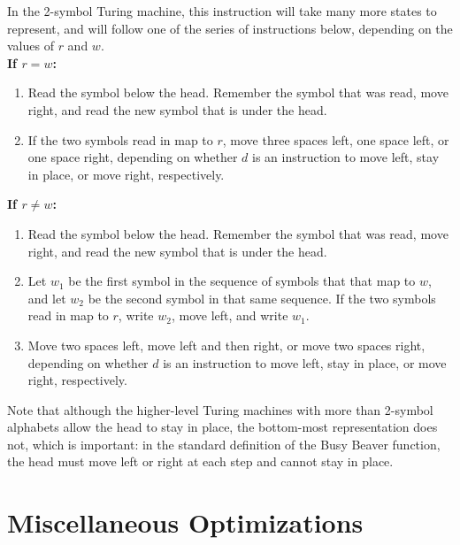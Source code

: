 \documentclass{report}
\begin{document}
In the 2-symbol Turing machine, this instruction will take many more states to represent, and will follow one of the series of instructions below, depending on the values of $r$ and $w$. \\

\textbf{If $r = w$:}

\begin{enumerate}

\item Read the symbol below the head. Remember the symbol that was read, move right, and read the new symbol that is under the head. 
\item If the two symbols read in map to $r$, move three spaces left, one space left, or one space right, depending on whether $d$ is an instruction to move left, stay in place, or move right, respectively.

\end{enumerate}

\textbf{If $r \not= w$:}

\begin{enumerate}

\item Read the symbol below the head. Remember the symbol that was read, move right, and read the new symbol that is under the head.
\item Let $w_1$ be the first symbol in the sequence of symbols that that map to $w$, and let $w_2$ be the second symbol in that same sequence. If the two symbols read in map to $r$, write $w_2$, move left, and write $w_1$.
\item Move two spaces left, move left and then right, or move two spaces right, depending on whether $d$ is an instruction to move left, stay in place, or move right, respectively.

\end{enumerate}

Note that although the higher-level Turing machines with more than 2-symbol alphabets allow the head to stay in place, the bottom-most representation does not, which is important: in the standard definition of the Busy Beaver function, the head must move left or right at each step and cannot stay in place.


\section{Miscellaneous Optimizations}
\end{document}
